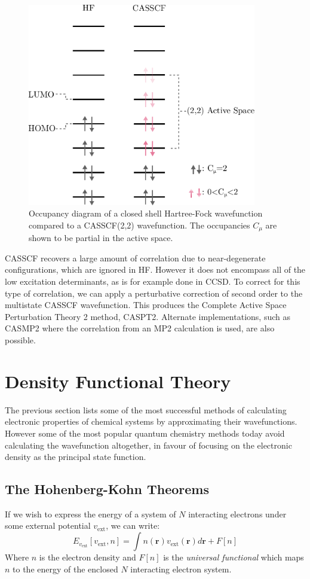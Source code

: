 \begin{figure}
\centering
\includegraphics[width=10cm]{Chapters/2Methods/active_space.pdf}
\caption{Occupancy diagram of a closed shell Hartree-Fock wavefunction compared to a CASSCF(2,2) wavefunction. The occupancies $C_{\mu}$ are shown to be partial in the active space.}
\label{fig:cas}
\end{figure}

CASSCF recovers a large amount of correlation due to near-degenerate configurations, which are ignored in HF. However it does not encompass all of the low excitation determinants, as is for example done in CCSD. To correct for this type of correlation, we can apply a perturbative correction of second order to the multistate CASSCF wavefunction. This produces the Complete Active Space Perturbation Theory 2 method, CASPT2.\cite{Andersson1990,Andersson1992} Alternate implementations, such as CASMP2 where the correlation from an MP2 calculation is used, are also possible.\cite{McDouall1988}

\section{Density Functional Theory}

The previous section lists some of the most successful methods of calculating electronic properties of chemical systems by approximating their wavefunctions. However some of the most popular quantum chemistry methods today avoid calculating the wavefunction altogether, in favour of focusing on the electronic density as the principal state function.

\subsection{The Hohenberg-Kohn Theorems}
If we wish to express the energy of a system of $N$ interacting electrons under some external potential $v_{\text{ext}}$, we can write:
\begin{equation}
    E_{v_{\text{ext}}}[v_{\text{ext}},n] = \int n(\bm{r}) v_{\text{ext}}(\bm{r}) d\bm{r} + F[n]
\end{equation}
Where $n$ is the electron density and $F[n]$ is the \textit{universal functional} which maps $n$ to the energy of the enclosed $N$ interacting electron system.

